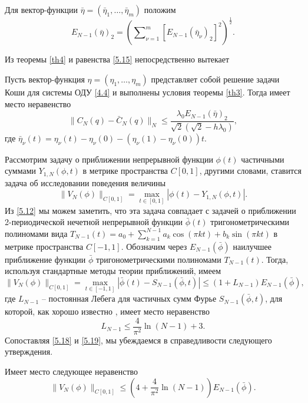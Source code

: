 Для вектор-функции $\bar\eta=(\bar\eta_1,\ldots,\bar\eta_m)$ положим
$$
E_ {N-1}(\bar\eta)_2=\left(\sum\nolimits_{\nu=1}^m [E_ {N-1}(\bar\eta_\nu)_2]^2\right)^\frac12.
$$

Из теоремы \ref{th4} и равенства \eqref{5.15} непосредственно вытекает
\begin{corollary}\label{cor1}Пусть вектор-функция $\eta=(\eta_1,\ldots,\eta_m)$ представляет собой решение задачи Коши для системы ОДУ \eqref{4.4} и выполнены условия теоремы \ref{th3}. Тогда имеет место неравенство
	\begin{equation}\label{5.16}
	\|C_N(q)-\bar C_N(q)\|_N\le \frac{\lambda_0 E_{N-1}(\bar\eta)_2} {\sqrt{2}(\sqrt{2}-h\lambda_0)},
	\end{equation}
	где $\bar\eta_\nu(t)=\eta_\nu(t)-\eta_\nu(0)-(\eta_\nu(1)-\eta_\nu(0))t$.
\end{corollary}

Рассмотрим  задачу о приближении  непрерывной функции $\phi(t)$ частичными суммами $Y_{1,N}(\phi,t)$ в метрике пространства $C[0,1]$, другими словами, ставится задача об исследовании поведения величины
\begin{equation}\label{5.17}
\|V_N(\phi)\|_{C[0,1]}=\max_{t\in[0,1]}|\phi(t)-Y_{1,N}(\phi,t)|.
\end{equation}
Из \eqref{5.12} мы можем заметить, что эта задача совпадает с задачей о приближении 2-периодической нечетной непрерывной функции $\bar \phi(t)$ тригонометрическими полиномами вида $T_{N-1}(t)=a_0+\sum_{k=1}^{N-1}a_k\cos(\pi kt)+b_k\sin(\pi kt)$ в метрике пространства  $C[-1,1]$. Обозначим через $E_{N-1}(\bar\phi)$ наилучшее приближение функции $\bar\phi$ тригонометрическими полиномами $T_{N-1}(t)$. Тогда, используя стандартные методы теории приближений,  имеем
\begin{equation}\label{5.18}
\|V_N(\phi)\|_{C[0,1]}=\max_{t\in[-1,1]}|\bar\phi(t)-S_{N-1}(\bar\phi,t)|\le (1+L_{N-1})E_{N-1}(\bar\phi),
\end{equation}
где $L_{N-1}$ -- постоянная Лебега для частичных сумм Фурье $S_{N-1}(\bar\phi,t)$, для которой, как хорошо известно \cite{Dzjadyc}, имеет место неравенство
\begin{equation}\label{5.19}
L_{N-1}\le \frac{4}{\pi^2}\ln(N-1)+3.
\end{equation}
Сопоставляя \eqref{5.18} и  \eqref{5.19}, мы убеждаемся в справедливости следующего утверждения.
\begin{corollary}\label{cor2} Имеет место следующее неравенство
	\begin{equation}\label{5.20}
	\|V_N(\phi)\|_{C[0,1]}\le \left(4+\frac{4}{\pi^2}\ln(N-1)\right)E_{N-1}(\bar\phi).
	\end{equation}
\end{corollary}

